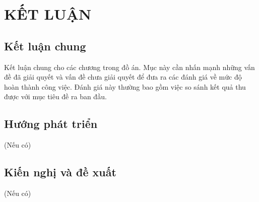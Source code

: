 \documentclass{article} %
\begin{document}
\section*{KẾT LUẬN}
\subsection*{Kết luận chung}
Kết luận chung cho các chương trong đồ án. Mục này cần nhấn mạnh những vấn đề đã giải quyết và vấn đề chưa giải quyết để đưa ra các đánh giá về mức độ hoàn thành công việc. Đánh giá này thường bao gồm việc so sánh kết quả thu được với mục tiêu đề ra ban đầu.
\subsection*{Hướng phát triển}
(Nếu có)
\subsection*{Kiến nghị và đề xuất}
(Nếu có)
\newpage
{}


\newpage
\end{document}

